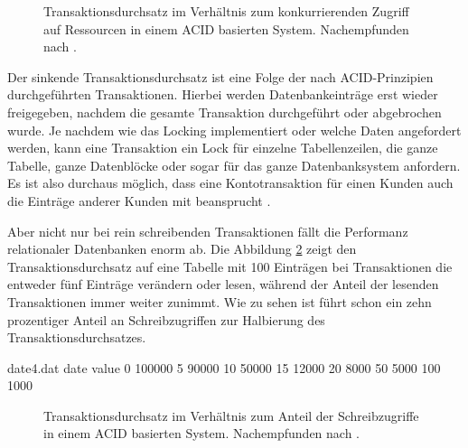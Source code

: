 \documentclass[12pt,oneside,a4paper,parskip]{scrbook}
\begin{document}
\begin{figure}
\begin{center}
\caption[Transaktionsdurchsatz im Verhältnis zum konkurrierenden Zugriff]{Transaktionsdurchsatz im Verhältnis zum konkurrierenden Zugriff auf Ressourcen in einem ACID basierten System. Nachempfunden nach \cite{salt}.}
\label{salt}
\end{center}
\end{figure}
Der sinkende Transaktionsdurchsatz ist eine Folge der nach ACID-Prinzipien durchgeführten Transaktionen. Hierbei werden Datenbankeinträge erst wieder freigegeben, nachdem die gesamte Transaktion durchgeführt oder abgebrochen wurde. Je nachdem wie das Locking implementiert oder welche Daten angefordert werden, kann eine Transaktion ein Lock für einzelne Tabellenzeilen, die ganze Tabelle, ganze Datenblöcke oder sogar für das ganze Datenbanksystem anfordern. Es ist also durchaus möglich, dass eine Kontotransaktion für einen Kunden auch die Einträge anderer Kunden mit beansprucht \cite{locking}\cite{dbarchitecture}.

Aber nicht nur bei rein schreibenden Transaktionen fällt die Performanz relationaler Datenbanken enorm ab. Die Abbildung \ref{salt2} zeigt den Transaktionsdurchsatz auf eine Tabelle mit 100 Einträgen bei Transaktionen die entweder fünf Einträge verändern oder lesen, während der Anteil der lesenden Transaktionen immer weiter zunimmt. Wie zu sehen ist führt schon ein zehn prozentiger Anteil an Schreibzugriffen zur Halbierung des Transaktionsdurchsatzes.
\begin{filecontents}{date4.dat}
date  value
0     100000
5     90000
10    50000
15    12000
20     8000
50     5000
100    1000
\end{filecontents}


\begin{figure}
\begin{center}
\caption[Transaktionsdurchsatz im Verhältnis zum Anteil der Schreibzugriffe]{Transaktionsdurchsatz im Verhältnis zum Anteil der Schreibzugriffe in einem ACID basierten System. Nachempfunden nach \cite{salt}.}
\label{salt2}
\end{center}
\end{figure}
\end{document}
